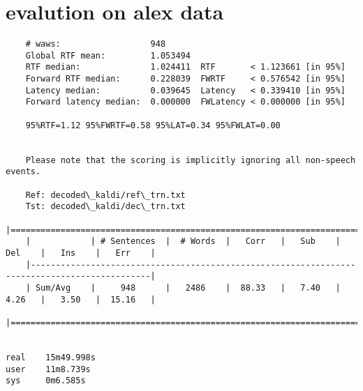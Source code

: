 \section{evalution on alex data}
\label{sec:evalution_on_alex_data}
\begin{verbatim}
    # waws:                  948
    Global RTF mean:         1.053494
    RTF median:              1.024411  RTF       < 1.123661 [in 95%]
    Forward RTF median:      0.228039  FWRTF     < 0.576542 [in 95%]
    Latency median:          0.039645  Latency   < 0.339410 [in 95%]
    Forward latency median:  0.000000  FWLatency < 0.000000 [in 95%]
    
    95%RTF=1.12 95%FWRTF=0.58 95%LAT=0.34 95%FWLAT=0.00


    Please note that the scoring is implicitly ignoring all non-speech events.
    
    Ref: decoded\_kaldi/ref\_trn.txt
    Tst: decoded\_kaldi/dec\_trn.txt
    |==============================================================================================|
    |            | # Sentences  |  # Words  |   Corr   |   Sub    |   Del    |   Ins    |   Err    |
    |----------------------------------------------------------------------------------------------|
    | Sum/Avg    |     948      |   2486    |  88.33   |   7.40   |   4.26   |   3.50   |  15.16   |
    |==============================================================================================|
    

real    15m49.998s
user    11m8.739s
sys     0m6.585s
\end{verbatim}




